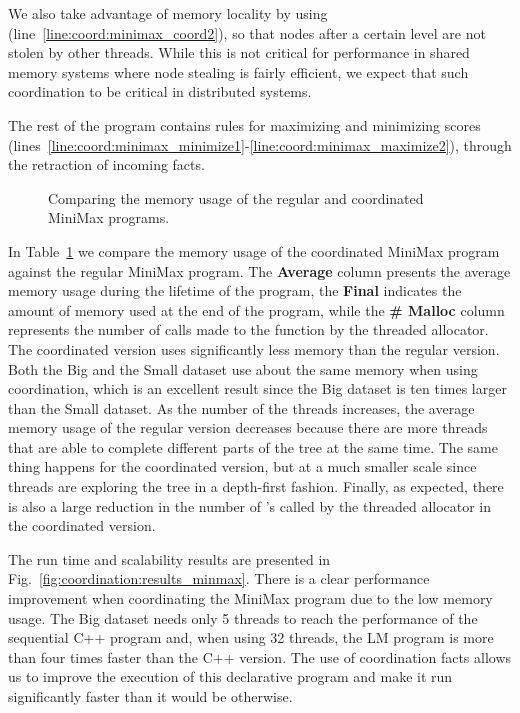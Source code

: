 We also take advantage of memory locality by using 
(line~\ref{line:coord:minimax_coord2}), so that nodes after a certain level are
   not stolen by other threads. While this is not critical for performance in
   shared memory systems where node stealing is fairly efficient, we expect that
   such coordination to be critical in distributed systems.

The rest of the program contains rules for maximizing and minimizing scores
(lines~\ref{line:coord:minimax_minimize1}-\ref{line:coord:minimax_maximize2}),
through the retraction of  incoming facts.

\begin{figure}[ht]
   \begin{center}
      
   \end{center}

   \caption{Comparing the memory usage of the regular and coordinated MiniMax
   programs.}
   \label{results:memory_minmax}
\end{figure}

In Table~\ref{results:memory_minmax} we compare the memory usage of the
coordinated MiniMax program against the regular MiniMax program. The
\textbf{Average} column presents the average memory usage during the lifetime of
the program, the \textbf{Final} indicates the amount of memory used at the end
of the program, while the \textbf{\# Malloc} column represents the number of
calls made to the  function by the threaded allocator. The
coordinated version uses significantly less memory than the regular version.
Both the Big and the Small dataset use about the same memory when using
coordination, which is an excellent result since the Big dataset is ten times
larger than the Small dataset.  As the number of the threads increases, the
average memory usage of the regular version decreases because there are more
threads that are able to complete different parts of the tree at the same time.
The same thing happens for the coordinated version, but at a much smaller scale
since threads are exploring the tree in a depth-first fashion. Finally, as
expected, there is also a large reduction in the number of 's
called by the threaded allocator in the coordinated version.

The run time and scalability results are presented in
Fig.~\ref{fig:coordination:results_minmax}. There is a clear performance
improvement when coordinating the MiniMax program due to the low memory usage.
The Big dataset needs only 5 threads to reach the performance of the
sequential C++ program and, when using 32 threads, the LM program is more than
four times faster than the C++ version. The use of coordination facts allows us
to improve the execution of this declarative program and make it run
significantly faster than it would be otherwise.

